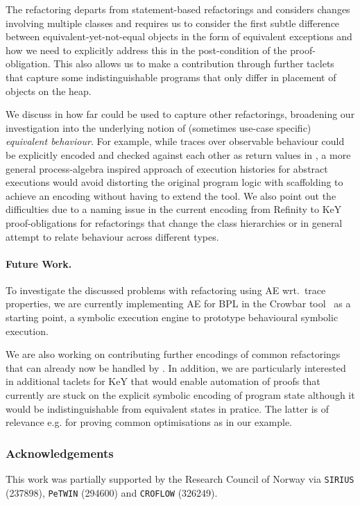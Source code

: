 \documentclass[runningheads]{llncs}
\begin{document}
The  refactoring departs from statement-based refactorings and considers changes involving multiple classes and requires us to consider the first subtle difference between equivalent-yet-not-equal objects in the form of equivalent exceptions and how we need to explicitly address this in the post-condition of the proof-obligation.
This also allows us to make a contribution through further taclets that capture some indistinguishable programs that only differ in placement of objects on the heap.

We discuss in how far \Refinity{} could be used to capture other refactorings, broadening our investigation into the underlying notion of (sometimes use-case specific) \textit{equivalent behaviour}.
For example, while traces over observable behaviour could be explicitly encoded and checked against each other as return values in \Refinity{}, a more general process-algebra inspired approach of execution histories for abstract executions would avoid distorting the original program logic with scaffolding to achieve an encoding without having to extend the tool.
We also point out the difficulties due to a naming issue in the current encoding from Refinity to KeY proof-obligations for refactorings that change the class hierarchies or in general attempt to relate behaviour across different types.

\paragraph{Future Work.} 
To investigate the discussed problems with refactoring using AE wrt.\ trace properties, we are currently implementing AE for BPL in the Crowbar tool~\cite{crowbar} as a starting point, a symbolic execution engine to prototype behavioural symbolic execution.

We are also working on contributing further encodings of common refactorings that can already now be handled by \Refinity{}.
In addition, we are particularly interested in additional taclets for KeY that would enable automation of proofs
that currently are stuck on the explicit symbolic encoding of program state although it would be indistinguishable from equivalent states in pratice.
The latter is of relevance e.g. for proving common optimisations as in our  example.

\subsubsection*{Acknowledgements}
This work was partially supported by the Research Council of Norway via \texttt{SIRIUS} (237898), \texttt{PeTWIN} (294600) and \texttt{CROFLOW} (326249).
%

% 



\end{document}
